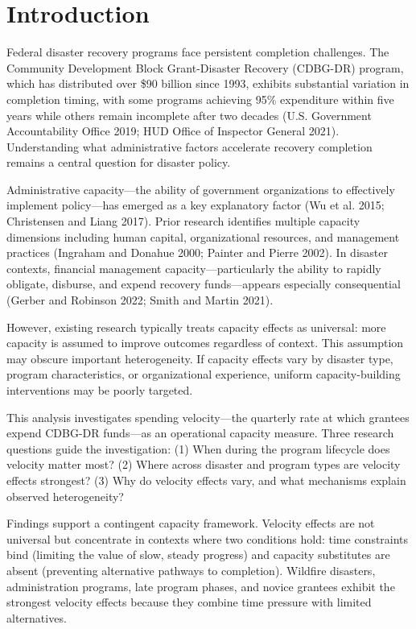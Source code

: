 \documentclass[
  12pt,
  letterpaper,
]{article}
\begin{document}
\section{Introduction}\label{introduction}

Federal disaster recovery programs face persistent completion
challenges. The Community Development Block Grant-Disaster Recovery
(CDBG-DR) program, which has distributed over \$90 billion since 1993,
exhibits substantial variation in completion timing, with some programs
achieving 95\% expenditure within five years while others remain
incomplete after two decades (U.S. Government Accountability Office
2019; HUD Office of Inspector General 2021). Understanding what
administrative factors accelerate recovery completion remains a central
question for disaster policy.

Administrative capacity---the ability of government organizations to
effectively implement policy---has emerged as a key explanatory factor
(Wu et al. 2015; Christensen and Liang 2017). Prior research identifies
multiple capacity dimensions including human capital, organizational
resources, and management practices (Ingraham and Donahue 2000; Painter
and Pierre 2002). In disaster contexts, financial management
capacity---particularly the ability to rapidly obligate, disburse, and
expend recovery funds---appears especially consequential (Gerber and
Robinson 2022; Smith and Martin 2021).

However, existing research typically treats capacity effects as
universal: more capacity is assumed to improve outcomes regardless of
context. This assumption may obscure important heterogeneity. If
capacity effects vary by disaster type, program characteristics, or
organizational experience, uniform capacity-building interventions may
be poorly targeted.

This analysis investigates spending velocity---the quarterly rate at
which grantees expend CDBG-DR funds---as an operational capacity
measure. Three research questions guide the investigation: (1) When
during the program lifecycle does velocity matter most? (2) Where across
disaster and program types are velocity effects strongest? (3) Why do
velocity effects vary, and what mechanisms explain observed
heterogeneity?

Findings support a contingent capacity framework. Velocity effects are
not universal but concentrate in contexts where two conditions hold:
time constraints bind (limiting the value of slow, steady progress) and
capacity substitutes are absent (preventing alternative pathways to
completion). Wildfire disasters, administration programs, late program
phases, and novice grantees exhibit the strongest velocity effects
because they combine time pressure with limited alternatives.
\end{document}

